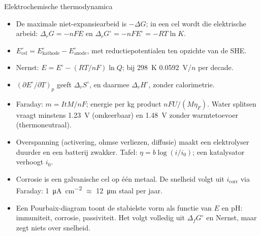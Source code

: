 \begin{samenvatting}{Elektrochemische thermodynamica}
\begin{itemize}
\item De maximale niet-expansiearbeid is $-\Delta G$; in een cel wordt die elektrische arbeid: $\Delta_rG = -nFE$ en $\Delta_rG^\circ = -nFE^\circ = -RT\ln K$.
\item $E^\circ_\mathrm{cel} = E^\circ_\mathrm{kathode} - E^\circ_\mathrm{anode}$, met reductiepotentialen ten opzichte van de SHE.
\item Nernst: $E = E^\circ - (RT/nF)\ln Q$; bij \SI{298}{\kelvin} \SI{0.0592}{\volt}/$n$ per decade.
\item $(\partial E^\circ/\partial T)_p$ geeft $\Delta_rS^\circ$, en daarmee $\Delta_rH^\circ$, zonder calorimetrie.
\item Faraday: $m = ItM/nF$; energie per kg product $nFU/(M\eta_F)$. Water splitsen vraagt minstens \SI{1.23}{\volt} (omkeerbaar) en \SI{1.48}{\volt} zonder warmtetoevoer (thermoneutraal).
\item Overspanning (activering, ohmse verliezen, diffusie) maakt een elektrolyser duurder en een batterij zwakker. Tafel: $\eta = b\log(i/i_0)$; een katalysator verhoogt $i_0$.
\item Corrosie is een galvanische cel op \'e\'en metaal. De snelheid volgt uit $i_\mathrm{corr}$ via Faraday: \SI{1}{\micro\ampere\per\centi\metre\squared} $\approx$ \SI{12}{\micro\metre} staal per jaar.
\item Een Pourbaix-diagram toont de stabielste vorm als functie van $E$ en pH: immuniteit, corrosie, passiviteit. Het volgt volledig uit $\Delta_fG^\circ$ en Nernst, maar zegt niets over snelheid.
\end{itemize}
\end{samenvatting}

